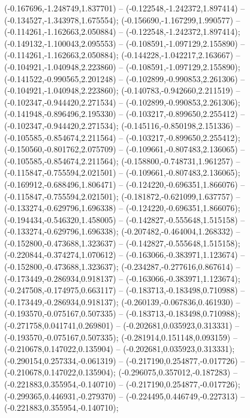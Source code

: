  (-0.167696,-1.248749,1.837701) -- (-0.122548,-1.242372,1.897414) -- (-0.134527,-1.343978,1.675554);
 (-0.156690,-1.167299,1.990577) -- (-0.114261,-1.162663,2.050884) -- (-0.122548,-1.242372,1.897414);
 (-0.149132,-1.100043,2.095553) -- (-0.108591,-1.097129,2.155890) -- (-0.114261,-1.162663,2.050884);
 (-0.144228,-1.042217,2.163667) -- (-0.104921,-1.040948,2.223860) -- (-0.108591,-1.097129,2.155890);
 (-0.141522,-0.990565,2.201248) -- (-0.102899,-0.990853,2.261306) -- (-0.104921,-1.040948,2.223860);
 (-0.140783,-0.942660,2.211519) -- (-0.102347,-0.944420,2.271534) -- (-0.102899,-0.990853,2.261306);
 (-0.141948,-0.896496,2.195330) -- (-0.103217,-0.899650,2.255412) -- (-0.102347,-0.944420,2.271534);
 (-0.145116,-0.850198,2.151336) -- (-0.105585,-0.854674,2.211564) -- (-0.103217,-0.899650,2.255412);
 (-0.150560,-0.801762,2.075709) -- (-0.109661,-0.807483,2.136065) -- (-0.105585,-0.854674,2.211564);
 (-0.158800,-0.748731,1.961257) -- (-0.115847,-0.755594,2.021501) -- (-0.109661,-0.807483,2.136065);
 (-0.169912,-0.688496,1.806471) -- (-0.124220,-0.696351,1.866076) -- (-0.115847,-0.755594,2.021501);
 (-0.181872,-0.621099,1.637757) -- (-0.133274,-0.629796,1.696338) -- (-0.124220,-0.696351,1.866076);
 (-0.194434,-0.546320,1.458005) -- (-0.142827,-0.555648,1.515158) -- (-0.133274,-0.629796,1.696338);
 (-0.207482,-0.464004,1.268332) -- (-0.152800,-0.473688,1.323637) -- (-0.142827,-0.555648,1.515158);
 (-0.220844,-0.374274,1.070612) -- (-0.163066,-0.383971,1.123674) -- (-0.152800,-0.473688,1.323637);
 (-0.234287,-0.277616,0.867614) -- (-0.173449,-0.286934,0.918137) -- (-0.163066,-0.383971,1.123674);
 (-0.247508,-0.174975,0.663117) -- (-0.183713,-0.183498,0.710988) -- (-0.173449,-0.286934,0.918137);
 (-0.260139,-0.067836,0.461930) -- (-0.193570,-0.075167,0.507335) -- (-0.183713,-0.183498,0.710988);
 (-0.271758,0.041741,0.269801) -- (-0.202681,0.035923,0.313331) -- (-0.193570,-0.075167,0.507335);
 (-0.281914,0.151148,0.093159) -- (-0.210678,0.147022,0.135904) -- (-0.202681,0.035923,0.313331);
 (-0.290154,0.257334,-0.061319) -- (-0.217190,0.254877,-0.017726) -- (-0.210678,0.147022,0.135904);
 (-0.296075,0.357012,-0.187283) -- (-0.221883,0.355954,-0.140710) -- (-0.217190,0.254877,-0.017726);
 (-0.299365,0.446931,-0.279370) -- (-0.224495,0.446749,-0.227313) -- (-0.221883,0.355954,-0.140710);
